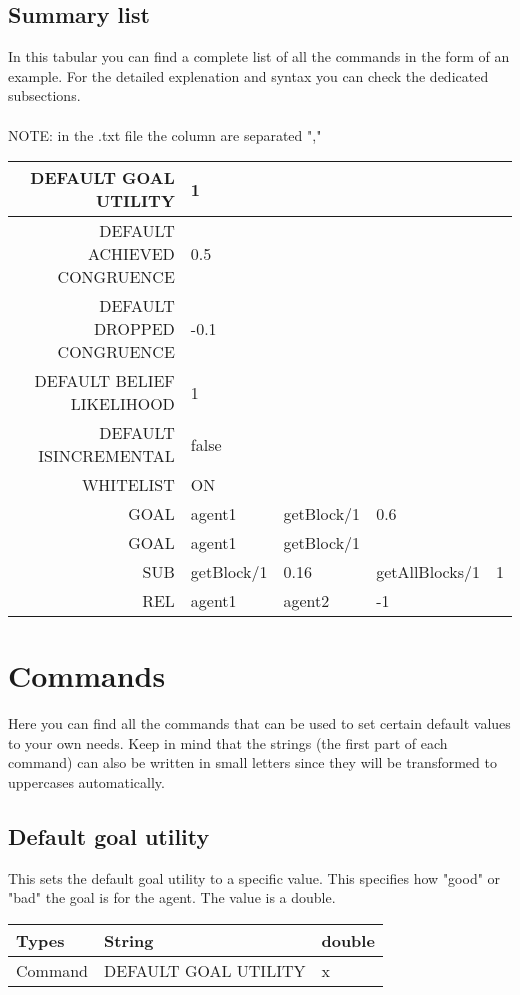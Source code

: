 \documentclass{scrartcl}
\begin{document}
\subsection{Summary list}
In this tabular you can find a complete list of all the commands in the form of an example. For the detailed explenation and syntax you can check the dedicated subsections.\\
\\
NOTE: in the .txt file the column are separated ","\\
\begin{tabular}{|r|l|l|l|l|}
	\hline  DEFAULT GOAL UTILITY & 1 &  &  &  \\ 
	\hline  DEFAULT ACHIEVED CONGRUENCE & 0.5 &  &  &  \\ 
	\hline  DEFAULT DROPPED CONGRUENCE & -0.1 &  &  &  \\ 
	\hline  DEFAULT BELIEF LIKELIHOOD& 1 &  &  &  \\ 
	\hline  DEFAULT ISINCREMENTAL & false &  &  &  \\ 
	\hline  WHITELIST & ON &  &  &  \\ 
	\hline  GOAL &  agent1 &  getBlock/1 &  0.6 &  \\ 
	\hline  GOAL &  agent1 &  getBlock/1 &  &  \\ 
	\hline  SUB& getBlock/1 & 0.16 & getAllBlocks/1 & 1 \\ 
	\hline  REL &  agent1&  agent2 & -1 &  \\
	\hline  
\end{tabular}

\pagebreak
\section{Commands}
Here you can find all the commands that can be used to set certain default values to your own needs. Keep in mind that the strings (the first part of each command) can also be written in small letters since they will be transformed to uppercases automatically. 

\subsection{Default goal utility}
This sets the default goal utility to a specific value. This specifies how "good" or "bad" the goal is for the agent. The value is a double.\\
\begin{tabular}{|l|l|l|}
	\hline  Types & String & double  \\ 
	\hline  Command & DEFAULT GOAL UTILITY & x  \\ 
	\hline 
\end{tabular}
\\
\end{document}
